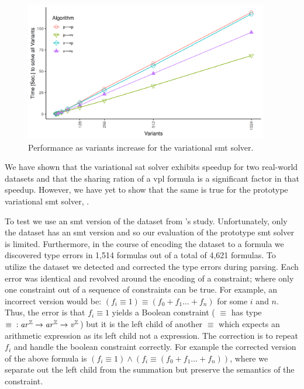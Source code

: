 \label{section:case-studies:vsmt}
%
\begin{figure}[h]
  \includegraphics[width=0.95\textwidth]{Plots/RQ1_Fin_Smt}
  \caption{Performance as variants increase for the variational
    \ac{smt} solver.}%
  \label{res:rq1:vsmt}
\end{figure}
%
We have shown that the variational \ac{sat} solver exhibits speedup for two
real-world datasets and that the sharing ration of a \ac{vpl} formula is a
significant factor in that speedup. However, we have yet to show that the same
is true for the prototype variational \ac{smt} solver, \vsmt{}.

To test \vsmt{} we use an \ac{smt} version of the \fin{} dataset from \nieke{}'s
study. Unfortunately, only the \fin{} dataset has an \ac{smt} version and so our
evaluation of the prototype \ac{smt} solver is limited. Furthermore, in the
course of encoding the dataset to a \evpl{} formula we discovered type errors in
1,514 formulas out of a total of 4,621 formulas. To utilize the dataset we
detected and corrected the type errors during parsing. Each error was identical
and revolved around the encoding of a  constraint; where only one
constraint out of a sequence of constraints can be true. For example, an
incorrect version would be: $(f_{i} \equiv{} 1) \equiv{} (f_{0} + f_{1} \ldots{}
+ f_{n})$ for some $i$ and $n$. Thus, the error is that $f_{i} \equiv 1$ yields
a Boolean constraint (\ie{} $\equiv$ has type $\equiv{} : \mathit{ar^{\mathbb{Z}}}{} \rightarrow
\mathit{ar^{\mathbb{Z}}}{} \rightarrow{} \mathit{v^{\mathbb{Z}}}{}$) but it is the left child of another $\equiv$ which
expects an arithmetic expression as its left child not a \eIL{} expression. The
correction is to repeat $f_{i}$ and handle the boolean constraint correctly. For
example the corrected version of the above formula is $(f_{i} \equiv{} 1)
\wedge{} (f_{i} \equiv{} (f_{0} + f_{1} \ldots{} + f_{n}))$, where we separate
out the left child from the summation but preserve the semantics of the
 constraint.

